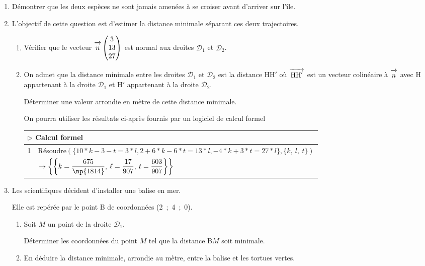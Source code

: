 \documentclass[10pt,a4paper]{article}
\newcommand{\vect}[1]{\overrightarrow{\,\mathstrut#1\,}}
\begin{document}
\smallskip

\begin{enumerate}
\item Démontrer que les deux espèces ne sont jamais amenées à se croiser avant d'arriver sur l'île.
\item L'objectif de cette question est d'estimer la distance minimale séparant ces deux
trajectoires.
	\begin{enumerate}
		\item Vérifier que le vecteur $\vect{n}\begin{pmatrix}3\\13\\27\end{pmatrix}$ est normal aux droites $\mathcal{D}_1$ et $\mathcal{D}_2$.
		\item On admet que la distance minimale entre les droites $\mathcal{D}_1$ et $\mathcal{D}_2$ est la distance HH$'$ où $\vect{\text{HH}'}$ est un vecteur colinéaire à $\vect{n}$ avec H appartenant à la droite $\mathcal{D}_1$ et H$'$ appartenant à la droite $\mathcal{D}_2$.

Déterminer une valeur arrondie en mètre de cette distance minimale.

On pourra utiliser les résultats ci-après fournis par un logiciel de calcul formel

\begin{tabularx}{\linewidth}{|c|X|}\hline
\multicolumn{2}{|l|}{$\triangleright$ Calcul formel}\\ \hline
1	&Résoudre$(\{10*k-3-t=3*l,2 + 6*k - 6*t = 13*l,- 4*k + 3*t= 27*l\},\{k,~l,~t\})$\\ 
	&$\to \left\{\left\{k = \dfrac{675}{\np{1814}},\:\ell = \dfrac{17}{907}, \: t =\dfrac{603}{907}\right\}\right\}$\\ \hline
\end{tabularx}

	\end{enumerate}
\item  Les scientifiques décident d'installer une balise en mer.

Elle est repérée par le point B de coordonnées (2~;~4~;~0).
	\begin{enumerate}
		\item Soit $M$ un point de la droite $\mathcal{D}_1$.
		
Déterminer les coordonnées du point $M$ tel que la distance B$M$ soit minimale.
		\item En déduire la distance minimale, arrondie au mètre, entre la balise et les tortues vertes.
	\end{enumerate}
\end{enumerate}
\end{document}
